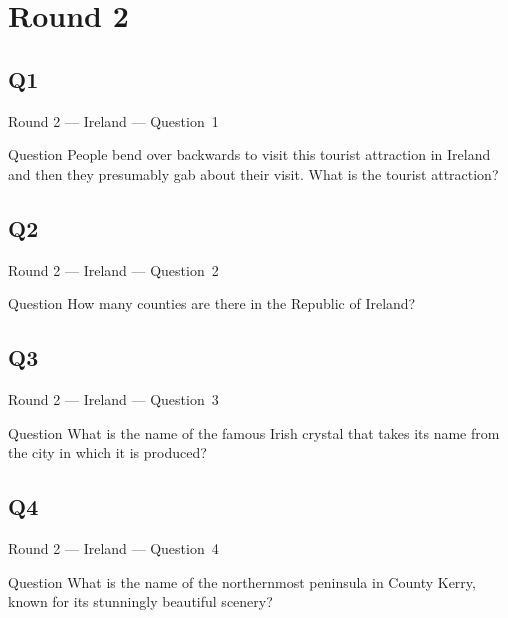 \documentclass[11pt]{beamer}
\begin{document}
\section{Round 2}
\subsection*{Q1}
\begin{frame}[t]{Round 2 --- Ireland --- \mbox{Question 1}}
    \vspace{-0.5em}
    \begin{block}{Question}
        People bend over backwards to visit this tourist attraction in Ireland and then they presumably gab about their visit. What is the tourist attraction?
    \end{block}
\end{frame}
\subsection*{Q2}
\begin{frame}[t]{Round 2 --- Ireland --- \mbox{Question 2}}
    \vspace{-0.5em}
    \begin{block}{Question}
        How many counties are there in the Republic of Ireland?
    \end{block}
\end{frame}
\subsection*{Q3}
\begin{frame}[t]{Round 2 --- Ireland --- \mbox{Question 3}}
    \vspace{-0.5em}
    \begin{block}{Question}
        What is the name of the famous Irish crystal that takes its name from the city in which it is produced?
    \end{block}
\end{frame}
\subsection*{Q4}
\begin{frame}[t]{Round 2 --- Ireland --- \mbox{Question 4}}
    \vspace{-0.5em}
    \begin{block}{Question}
        What is the name of the northernmost peninsula in County Kerry, known for its stunningly beautiful scenery?
    \end{block}
\end{frame}
\end{document}
